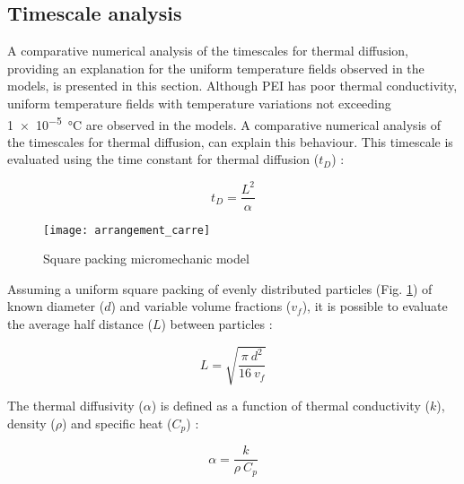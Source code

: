 \FloatBarrier
\subsection{Timescale analysis}
\label{sec:timeconstant}

A comparative numerical analysis of the timescales for thermal diffusion, providing an explanation for the uniform temperature fields observed in the models, is presented in this section. 
Although PEI has poor thermal conductivity, uniform temperature fields with temperature variations not exceeding \SI{1e-5}{\celsius} are observed in the models. 
A comparative numerical analysis of the timescales for thermal diffusion, can explain this behaviour. 
This timescale is evaluated using the time constant for thermal diffusion ($t_D$) : 

\begin{equation}
t_D = \frac{L^2}{\alpha}
\label{equa:time_constant}
\end{equation}

\begin{figure}[htb]
	\center
	\captionsetup{width=35mm}
	\texttt{[image: arrangement\_carre]}
	\caption{Square packing micromechanic model \cite{Brassard2018_figshare_article1}}
	\label{fig:square_packing}
\end{figure}

Assuming a uniform square packing of evenly distributed particles (Fig. \ref{fig:square_packing}) of known diameter ($d$) and variable volume fractions ($v_f$), it is possible to evaluate the average half distance ($L$) between particles :

\begin{equation}
L = \sqrt{\frac{\pi \ d^2}{16 \ v_f}}
\label{equa:L_average}
\end{equation}

The thermal diffusivity ($\alpha$) is defined as a function of thermal conductivity ($k$), density ($\rho$) and specific heat ($C_p$) : 

\begin{equation}
\alpha = \frac{k}{\rho \ C_p}
\label{equa:thermal_diffusivity}
\end{equation}

